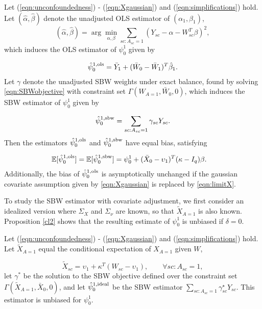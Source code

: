 \begin{proposition}\label{cl1}
Let (\ref{eqn:unconfoundedness}) - (\ref{eqn:Xgaussian}) and (\ref{eqn:simplifications}) hold.
Let $(\hat{\alpha}, \hat{\beta})$ denote the unadjusted OLS estimator of $(\alpha_1, \beta_1)$, 
\begin{equation}\label{eqn:prop1.beta}
(\hat{\alpha}, \hat{\beta}) = \arg \min_{\alpha, \beta} \sum_{sc:A_{sc}=1} (Y_{sc} - \alpha -  W_{sc}^T\beta)^2,
\end{equation}
which induces the OLS estimator of $\psi_0^1$ given by

\begin{align*}
\hat{\psi}^{1,\textup{ols}}_0 = \bar{Y}_1 + (\bar{W}_0 - \bar{W}_1)^T\hat{\beta}_1.
\end{align*}
%
Let ${\gamma}$ denote the unadjusted SBW weights under exact balance, found by solving \eqref{eqn:SBWobjective} with constraint set $\Gamma( W_{A=1}, \bar{W}_0, 0)$, which induces the SBW estimator of $\psi_0^1$ given by

\begin{align*}
\hat{\psi}^{1,\textup{sbw}}_0 = \sum_{sc: A_{sc} = 1} {\gamma}_{sc} Y_{sc}.
\end{align*}
%
Then the estimators $\hat{\psi}^{1, \textup{ols}}_0$ and $\hat{\psi}^{1, \textup{sbw}}_0$ have equal bias, satisfying

\begin{align*}
\mathbb{E}[\hat{\psi}_0^{1,\textup{ols}}] &= \mathbb{E}[\hat{\psi}^{1, \textup{sbw}}_0]  = \psi_0^1 + (\bar{X}_0 - \upsilon_1)^T(\mathbf{\kappa} - I_q)\beta.
\end{align*}
Additionally, the bias of $\hat{\psi}_0^{1,\textup{ols}}$ is asymptotically unchanged if the gaussian covariate assumption given by \eqref{eqn:Xgaussian} is replaced by \eqref{eqn:limitX}.
\end{proposition}

To study the SBW estimator with covariate adjustment, we first consider an idealized version where $\Sigma_X$ and $\Sigma_\nu$ are known, so that $\tilde{X}_{A=1}$ is also known. Proposition \ref{cl2} shows that the resulting estimate of $\psi_0^1$ is unbiased if $\delta = 0$.

\begin{proposition}\label{cl2}
Let (\ref{eqn:unconfoundedness}) - (\ref{eqn:Xgaussian}) and (\ref{eqn:simplifications}) hold. Let $\tilde{X}_{A=1}$ equal the conditional expectation of $X_{A=1}$ given $W$,

\[ \tilde{X}_{sc} = \upsilon_1 + \kappa^T (W_{sc} - \upsilon_1), \qquad \forall sc: A_{sc} = 1,\] let $\gamma^*$ be the solution to the SBW objective defined over the constraint set $\Gamma(\tilde{X}_{A=1}, \bar{X}_0, 0)$, and let $\hat{\psi}^{1, \textup{ideal}}_0$ be the SBW estimator $\sum_{sc: A_{sc} = 1}\gamma^\star_{sc}Y_{sc}$. This estimator is unbiased for $\psi_0^1$.
\end{proposition}



